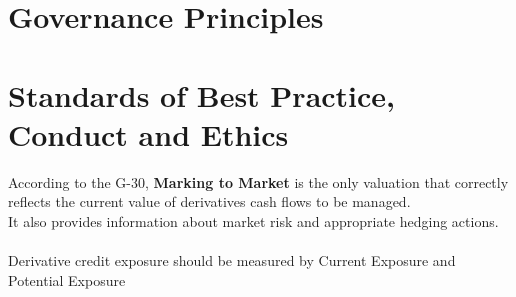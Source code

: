\documentclass[12pt, a4paper]{report}
\begin{document}
\section{Governance Principles}
\section{Standards of Best Practice, Conduct and Ethics}

According to the G-30, \textbf{Marking to Market} is the only
valuation that correctly reflects the current value of derivatives
cash flows to be managed.\\ It also provides information about
market risk and appropriate hedging actions.
\\
\\
Derivative credit exposure should be measured by Current Exposure
and Potential Exposure
\end{document}
